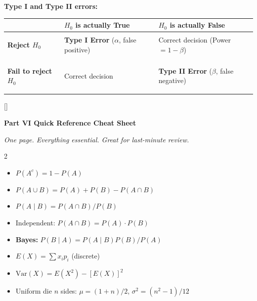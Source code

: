 \documentclass[11pt, letterpaper]{article}
\newcommand{\purplesections}{%
  \titleformat{\section}{\large\bfseries\color{sectionpurple}}{}{0em}{}[\color{sectionpurple}\titlerule]%
  \titleformat{\subsection}{\normalsize\bfseries\color{sectionpurple!80!black}}{}{0em}{}%
}
\newcommand{\partbanner}[3]{%
  \begin{tcolorbox}[colback=#1, colframe=#2, boxrule=1.2pt, arc=4pt,
    left=8pt, right=8pt, top=6pt, bottom=6pt]
    \begin{center}{\LARGE\bfseries #3}\end{center}
  \end{tcolorbox}%
}
\begin{document}
\textbf{Type I and Type II errors:}

\noindent
{\renewcommand{\arraystretch}{1.5}
\begin{tabularx}{\textwidth}{>{\bfseries\raggedright\arraybackslash}p{3.5cm}
                              >{\raggedright\arraybackslash}X
                              >{\raggedright\arraybackslash}X}
\toprule
\rowcolor{tableheaderteal}
\textbf{} & \textbf{$H_0$ is actually True} & \textbf{$H_0$ is actually False} \\
\midrule
\rowcolor{rowTe} \textbf{Reject $H_0$} & \textbf{Type I Error} ($\alpha$, false positive) & Correct decision (Power $= 1-\beta$) \\
\rowcolor{rowA}  \textbf{Fail to reject $H_0$} & Correct decision & \textbf{Type II Error} ($\beta$, false negative) \\
\bottomrule
\end{tabularx}}

\newpage

\purplesections
{}
\partbanner{part3bg}{sectionpurple}{Part VI \quad Quick Reference Cheat Sheet}

\vspace{4pt}
\begin{center}\small\itshape One page. Everything essential. Great for last-minute review.\end{center}
\vspace{4pt}

\begin{tcolorbox}[colback=part3bg, colframe=sectionpurple,
  title={\bfseries Probability Fundamentals}, arc=3pt, boxrule=1pt]
\footnotesize
\begin{multicols}{2}
\begin{itemize}[noitemsep, leftmargin=*]
  \item $P(A^c) = 1 - P(A)$
  \item $P(A \cup B) = P(A) + P(B) - P(A\cap B)$
  \item $P(A \mid B) = P(A \cap B) / P(B)$
  \item Independent: $P(A \cap B) = P(A) \cdot P(B)$
\end{itemize}
\columnbreak
\begin{itemize}[noitemsep, leftmargin=*]
  \item \textbf{Bayes:} $P(B\mid A) = P(A\mid B)P(B)/P(A)$
  \item $E(X) = \sum x_i p_i$ \quad (discrete)
  \item $\text{Var}(X) = E(X^2) - [E(X)]^2$
  \item Uniform die $n$ sides: $\mu = (1+n)/2$, $\sigma^2 = (n^2-1)/12$
\end{itemize}
\end{multicols}
\end{tcolorbox}
\end{document}

